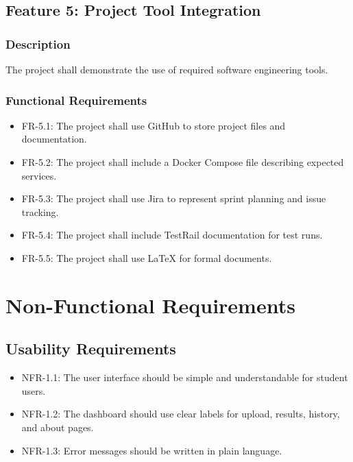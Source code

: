 \documentclass[12pt]{article}
\begin{document}
\subsection{Feature 5: Project Tool Integration}

\subsubsection{Description}

The project shall demonstrate the use of required software engineering tools.

\subsubsection{Functional Requirements}

\begin{itemize}
    \item FR-5.1: The project shall use GitHub to store project files and documentation.
    \item FR-5.2: The project shall include a Docker Compose file describing expected services.
    \item FR-5.3: The project shall use Jira to represent sprint planning and issue tracking.
    \item FR-5.4: The project shall include TestRail documentation for test runs.
    \item FR-5.5: The project shall use LaTeX for formal documents.
\end{itemize}

\section{Non-Functional Requirements}

\subsection{Usability Requirements}

\begin{itemize}
    \item NFR-1.1: The user interface should be simple and understandable for student users.
    \item NFR-1.2: The dashboard should use clear labels for upload, results, history, and about pages.
    \item NFR-1.3: Error messages should be written in plain language.
\end{itemize}
\end{document}
